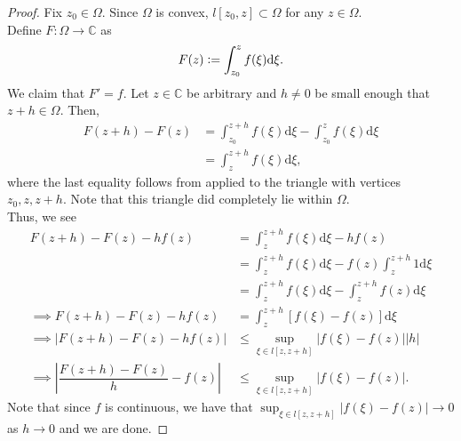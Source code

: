 \primexists*\label{cor:primexists2}
\begin{flushright}\hyperref[cor:primexists]{\upsym}\end{flushright}
\begin{proof}
	Fix $z_0 \in \Omega.$ Since $\Omega$ is convex, $l[z_0, z] \subset \Omega$ for any $z \in \Omega.$\\
	Define $F:\Omega \to \mathbb{C}$ as 
	\begin{equation*} 
		F(z) \vcentcolon= \int_{z_0}^{z} f(\xi) \mathrm{d}\xi.
	\end{equation*}
	We claim that $F' = f.$ Let $z \in \mathbb{C}$ be arbitrary and $h \neq 0$ be small enough that $z + h \in \Omega.$ Then,
	\begin{align*} 
		F(z + h) - F(z) &= \int_{z_0}^{z+h} f(\xi) \mathrm{d}\xi - \int_{z_0}^{z} f(\xi) \mathrm{d}\xi\\
		&= \int_{z}^{z+h} f(\xi) \mathrm{d}\xi,
	\end{align*}
	where the last equality follows from  applied to the triangle with vertices $z_0, z, z+h.$ Note that this triangle did completely lie within $\Omega.$\\
	Thus, we see
	\begin{align*} 
		F(z + h) - F(z) - hf(z) &= \int_{z}^{z+h} f(\xi) \mathrm{d}\xi - hf(z)\\
		&=\int_{z}^{z+h} f(\xi) \mathrm{d}\xi - f(z)\int_{z}^{z+h} 1 \mathrm{d}\xi\\
		&=\int_{z}^{z+h} f(\xi) \mathrm{d}\xi - \int_{z}^{z+h} f(z) \mathrm{d}\xi\\
		\implies F(z + h) - F(z) - hf(z)&= \int_{z}^{z+h} [f(\xi) - f(z)] \mathrm{d}\xi\\
		\implies \left|F(z + h) - F(z) - hf(z)\right|&\le \sup_{\xi \in l[z, z+h]}|f(\xi) - f(z)||h|\\
		\implies \left|\dfrac{F(z + h) - F(z)}{h} - f(z)\right| &\le \sup_{\xi \in l[z, z+h]}|f(\xi) - f(z)|.
	\end{align*}
	Note that since $f$ is continuous, we have that $\displaystyle\sup_{\xi \in l[z, z+h]}|f(\xi) - f(z)| \to 0$ as $h \to 0$ and we are done.
\end{proof}


